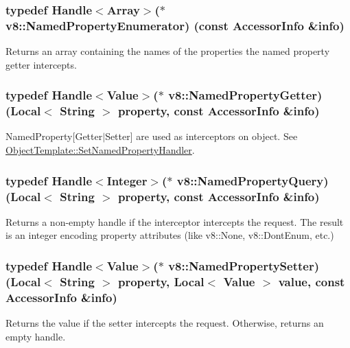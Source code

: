 \subsubsection[{Named\+Property\+Enumerator}]{\setlength{\rightskip}{0pt plus 5cm}typedef {\bf Handle}$<${\bf Array}$>$($\ast$ v8\+::\+Named\+Property\+Enumerator) (const {\bf Accessor\+Info} \&info)}\label{namespacev8_acbd04b83708cb5a80e73e0396f176e58}
Returns an array containing the names of the properties the named property getter intercepts. \hypertarget{namespacev8_ab9effde41da1c073eddbd4a11a62bd0b}{}
\subsubsection[{Named\+Property\+Getter}]{\setlength{\rightskip}{0pt plus 5cm}typedef {\bf Handle}$<${\bf Value}$>$($\ast$ v8\+::\+Named\+Property\+Getter) ({\bf Local}$<$ {\bf String} $>$ property, const {\bf Accessor\+Info} \&info)}\label{namespacev8_ab9effde41da1c073eddbd4a11a62bd0b}
Named\+Property\mbox{[}Getter$\vert$\+Setter\mbox{]} are used as interceptors on object. See \hyperlink{classv8_1_1_object_template_aa80e9db593d8b954c4153082dc7a439d}{Object\+Template\+::\+Set\+Named\+Property\+Handler}. \hypertarget{namespacev8_a0136e8102c101d9a39497f75daa9153b}{}
\subsubsection[{Named\+Property\+Query}]{\setlength{\rightskip}{0pt plus 5cm}typedef {\bf Handle}$<${\bf Integer}$>$($\ast$ v8\+::\+Named\+Property\+Query) ({\bf Local}$<$ {\bf String} $>$ property, const {\bf Accessor\+Info} \&info)}\label{namespacev8_a0136e8102c101d9a39497f75daa9153b}
Returns a non-\/empty handle if the interceptor intercepts the request. The result is an integer encoding property attributes (like v8\+::\+None, v8\+::\+Dont\+Enum, etc.) \hypertarget{namespacev8_a682b1fc46feab32605c4905612ffe870}{}
\subsubsection[{Named\+Property\+Setter}]{\setlength{\rightskip}{0pt plus 5cm}typedef {\bf Handle}$<${\bf Value}$>$($\ast$ v8\+::\+Named\+Property\+Setter) ({\bf Local}$<$ {\bf String} $>$ property, {\bf Local}$<$ {\bf Value} $>$ value, const {\bf Accessor\+Info} \&info)}\label{namespacev8_a682b1fc46feab32605c4905612ffe870}
Returns the value if the setter intercepts the request. Otherwise, returns an empty handle. \hypertarget{namespacev8_ab5cafda0c556bba990c660ce9c904e0d}{}
